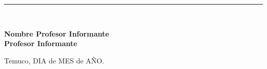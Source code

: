 \begin{titlepage}
{\begin{center}
\vspace*{0.5in}

\begin{flushright}
 \rule{65mm}{0.2mm}\\
\end{flushright}
\vspace*{-0.2in}
 \hspace*{3.5in} \textbf{Nombre Profesor Informante} \\
 \hspace*{3.5in} \textbf{Profesor Informante}

\vspace*{0.6in}

\begin{flushleft}
Temuco, DIA de MES de AÑO.
\end{flushleft}

\end{center}
}
\end{titlepage}

